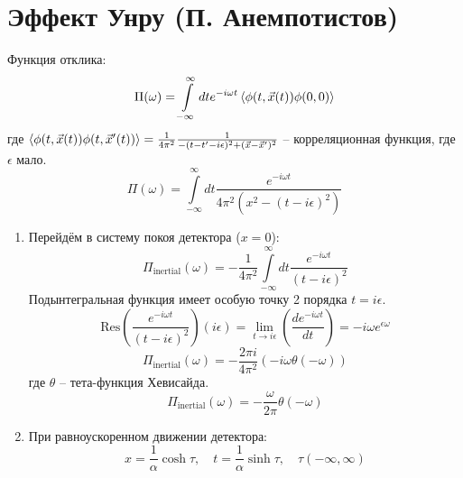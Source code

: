 \documentclass[12pt]{article}
\begin{document}
\section{Эффект Унру (П. Анемпотистов)}
Функция отклика:
\begin{equation}
    \Pi(\omega)=\int\limits_{-\infty}^\infty dte^{-i\omega t}\braket{\phi(t,\vec{x}(t))\phi(0,0)}
\end{equation}
где $\braket{\phi(t,\vec{x}(t))\phi(t,\vec{x}'(t))}=\frac{1}{4\pi^2}\frac{1}{-(t-t'-i\epsilon)^2+(\vec{x}-\vec{x}')^2}$ -- корреляционная функция, где $\epsilon$ мало.
\begin{equation}
    \Pi(\omega)=\int\limits_{-\infty}^\infty dt\frac{e^{-i\omega t}}{4\pi^2(x^2-(t-i\epsilon)^2)}
\end{equation}
\begin{enumerate}
    \item Перейдём в систему покоя детектора ($x=0$):
    \begin{equation}
        \Pi_\text{inertial}(\omega)=-\frac{1}{4\pi^2}\int\limits_{-\infty}^\infty dt\frac{e^{-i\omega t}}{(t-i\epsilon)^2}
    \end{equation}
    Подынтегральная функция имеет особую точку 2 порядка $t=i\epsilon$.
    \begin{equation}
        \text{Res}\left(\frac{e^{-i\omega t}}{(t-i\epsilon)^2}\right)(i\epsilon)=\lim\limits_{t\rightarrow i\epsilon}\left(\frac{de^{-i\omega t}}{dt}\right)=-i\omega e^{\epsilon\omega}
    \end{equation}
    \begin{equation}
        \Pi_\text{inertial}(\omega)=-\frac{2\pi i}{4\pi^2}(-i\omega \theta(-\omega))
    \end{equation}
    где $\theta$ -- тета-функция Хевисайда.
    \begin{equation}
        \boxed{\Pi_\text{inertial}(\omega)=-\frac{\omega}{2\pi}\theta(-\omega)}
    \end{equation}
    \item При равноускоренном движении детектора:
    \begin{equation}
        x=\frac{1}{\alpha}\cosh\tau,\quad t=\frac{1}{\alpha}\sinh\tau,\quad\tau(-\infty,\infty)
    \end{equation}

\end{enumerate}
\end{document}
